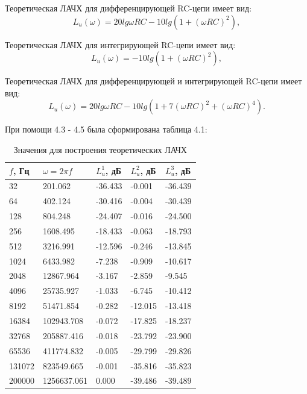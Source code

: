 Теоретическая ЛАЧХ для дифференцирующей RC-цепи имеет вид:
\begin{equation}
L_u(\omega) = 20lg \omega RC - 10lg(1+(\omega RC)^2),
\end{equation}

Теоретическая ЛАЧХ для интегрирующей RC-цепи имеет вид:
\begin{equation}
L_u(\omega) = -10lg(1+(\omega RC)^2),
\end{equation}

Теоретическая ЛАЧХ для дифференцирующей и интегрирующей RC-цепи имеет вид:
\begin{equation}
L_u(\omega) = 20lg \omega RC - 10lg(1+7(\omega RC)^2 + (\omega RC)^4).
\end{equation}

При помощи 4.3 - 4.5 была сформирована таблица 4.1:
\begin{table}[H]
	\begin{center}
	\caption{Значения для построения теоретических ЛАЧХ}
	\def\arraystretch{1.5}
		\begin{tabularx}{\textwidth}{|X|X|X|X|X|}
			\hline
			$f$, Гц & $\omega = 2 \pi f$ & $L_u^1$, дБ & $L_u^2$, дБ & $L_u^3$, дБ\\\hline	
			32 & 201.062 & -36.433 & -0.001 & -36.439\\\hline
			64 & 402.124 & -30.416 & -0.004 & -30.439\\\hline
			128 & 804.248 & -24.407 & -0.016 & -24.500\\\hline
			256 & 1608.495 & -18.433 & -0.063 & -18.793\\\hline
			512 & 3216.991 & -12.596 & -0.246 & -13.845\\\hline
			1024 & 6433.982 & -7.238 & -0.909 & -10.617\\\hline
			2048 & 12867.964 & -3.167 & -2.859 & -9.545\\\hline
			4096 & 25735.927 & -1.033 & -6.745 & -10.412\\\hline
			8192 & 51471.854 & -0.282 & -12.015 & -13.418\\\hline
			16384 & 102943.708 & -0.072 & -17.825 & -18.237\\\hline
			32768 & 205887.416 & -0.018 & -23.792 & -23.900\\\hline
			65536 & 411774.832 & -0.005 & -29.799 & -29.826\\\hline
			131072 & 823549.665 & -0.001 & -35.816 & -35.823\\\hline
			200000 & 1256637.061 & 0.000 & -39.486 & -39.489\\\hline

		\end{tabularx}
		\label{tt:11}
	\end{center}
\end{table}

